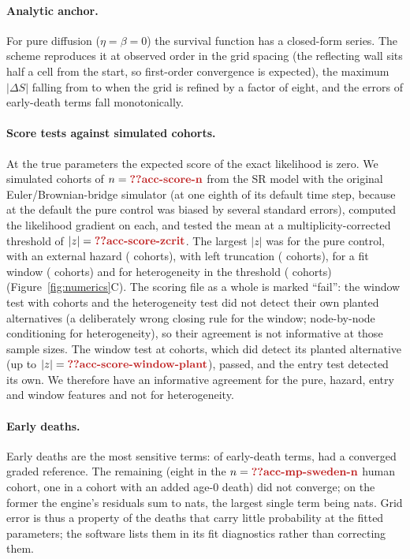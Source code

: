\paragraph{Analytic anchor.} For pure diffusion ($\eta=\beta=0$) the survival function has a closed-form series. The
scheme reproduces it at observed order  in the grid spacing (the reflecting wall sits half a cell from the start, so
first-order convergence is expected), the maximum $|\Delta S|$ falling from  to 
when the grid is refined by a factor of eight, and the errors of early-death terms fall monotonically.

\paragraph{Score tests against simulated cohorts.} At the true parameters the expected score of the exact likelihood
is zero. We simulated  cohorts of $n=\C{acc-score-n}$ from the SR model with the original
Euler/Brownian-bridge simulator (at one eighth of its default time step, because at the default the pure control was
biased by several standard errors), computed the likelihood gradient on each, and tested the mean at a
multiplicity-corrected threshold of $|z|=\C{acc-score-zcrit}$. The largest $|z|$ was  for the pure
control,  with an external hazard ( cohorts),  with left truncation
( cohorts),  for a fit window ( cohorts) and  for
heterogeneity in the threshold ( cohorts) (Figure~\ref{fig:numerics}C). The scoring file as a whole is marked
``fail'': the window test with  cohorts and the heterogeneity test did not detect their own planted
alternatives (a deliberately wrong closing rule for the window; node-by-node conditioning for heterogeneity), so their
agreement is not informative at those sample sizes. The window test at  cohorts, which did detect its
planted alternative (up to $|z|=\C{acc-score-window-plant}$), passed, and the entry test detected its own. We therefore
have an informative agreement for the pure, hazard, entry and window features and not for heterogeneity.

\paragraph{Early deaths.} Early deaths are the most sensitive terms: of  early-death terms,  had a converged graded reference.
The remaining  (eight in the $n=\C{acc-mp-sweden-n}$ human cohort, one in a cohort with an added age-0 death) did not
converge; on the former the engine's residuals sum to  nats, the largest single term being
 nats. Grid error is thus a property of the deaths that carry little probability at the fitted
parameters; the software lists them in its fit diagnostics rather than correcting them.%

